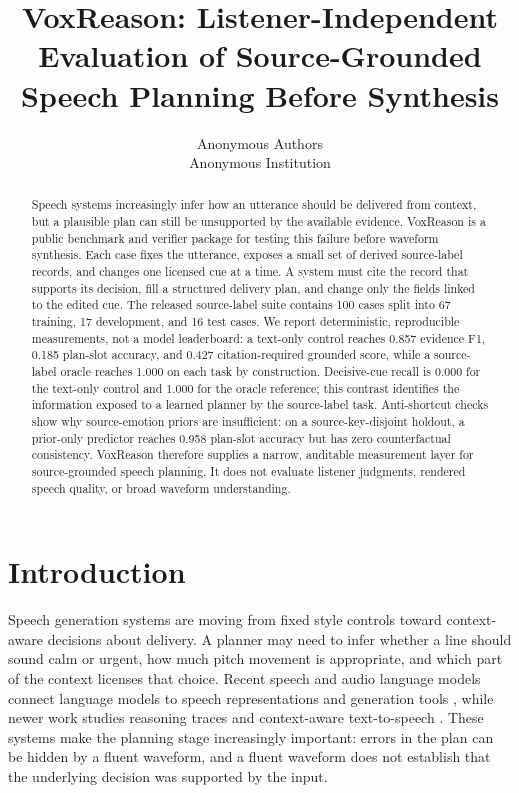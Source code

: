 \documentclass{article}
\title{VoxReason: Listener-Independent Evaluation of Source-Grounded Speech Planning Before Synthesis}
\author{Anonymous Authors\\
Anonymous Institution}
\date{}
\begin{document}
\maketitle
{}
\fancyfoot[C]{\small\thepage}
\thispagestyle{fancy}

\begin{abstract}
Speech systems increasingly infer how an utterance should be delivered from context, but a plausible plan can still be unsupported by the available evidence. VoxReason is a public benchmark and verifier package for testing this failure before waveform synthesis. Each case fixes the utterance, exposes a small set of derived source-label records, and changes one licensed cue at a time. A system must cite the record that supports its decision, fill a structured delivery plan, and change only the fields linked to the edited cue. The released source-label suite contains 100 cases split into 67 training, 17 development, and 16 test cases. We report deterministic, reproducible measurements, not a model leaderboard: a text-only control reaches 0.857 evidence F1, 0.185 plan-slot accuracy, and 0.427 citation-required grounded score, while a source-label oracle reaches 1.000 on each task by construction. Decisive-cue recall is 0.000 for the text-only control and 1.000 for the oracle reference; this contrast identifies the information exposed to a learned planner by the source-label task. Anti-shortcut checks show why source-emotion priors are insufficient: on a source-key-disjoint holdout, a prior-only predictor reaches 0.958 plan-slot accuracy but has zero counterfactual consistency. VoxReason therefore supplies a narrow, auditable measurement layer for source-grounded speech planning. It does not evaluate listener judgments, rendered speech quality, or broad waveform understanding.
\end{abstract}

\section{Introduction}

Speech generation systems are moving from fixed style controls toward context-aware decisions about delivery. A planner may need to infer whether a line should sound calm or urgent, how much pitch movement is appropriate, and which part of the context licenses that choice. Recent speech and audio language models connect language models to speech representations and generation tools \cite{speechgpt,audiogpt}, while newer work studies reasoning traces and context-aware text-to-speech \cite{thinksound,cottts}. These systems make the planning stage increasingly important: errors in the plan can be hidden by a fluent waveform, and a fluent waveform does not establish that the underlying decision was supported by the input.
\end{document}
